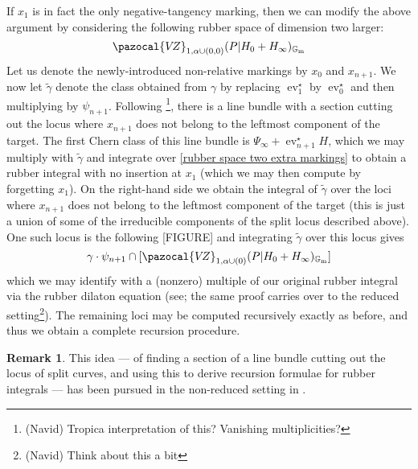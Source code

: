 \documentclass[11pt]{amsart}
\newcommand{\VZ}{\pazocal{V\!Z}}
\newcommand{\st}{\star}
\newcommand{\Gm}{\mathbb{G}_{\text{m}}}
\newcommand{\ev}{\operatorname{ev}}
\theoremstyle{definition}
\theoremstyle{definition}
\newtheorem{remark}[thm]{Remark}
\begin{document}
If $x_1$ is in fact the only negative-tangency marking, then we can modify the above argument by considering the following rubber space of dimension two larger:
\begin{equation}\label{rubber space two extra markings} \VZ_{1,\alpha\cup(0,0)}(P|H_0+H_\infty)_{\Gm} \end{equation}
Let us denote the newly-introduced non-relative markings by $x_0$ and $x_{n+1}$. We now let $\tilde\gamma$ denote the class obtained from $\gamma$ by replacing $\ev_1^\st$ by $\ev_0^\st$ and then multiplying by $\psi_{n+1}$. Following \cite{EKatz}\footnote{(Navid) Tropica interpretation of this? Vanishing multiplicities?}, there is a line bundle with a section cutting out the locus where $x_{n+1}$ does not belong to the leftmost component of the target. The first Chern class of this line bundle is $\Psi_\infty+\ev_{n+1}^\st H$, which we may multiply with $\tilde\gamma$ and integrate over \eqref{rubber space two extra markings} to obtain a rubber integral with no insertion at $x_1$ (which we may then compute by forgetting $x_1$). On the right-hand side we obtain the integral of $\tilde\gamma$ over the loci where $x_{n+1}$ does not belong to the leftmost component of the target (this is just a union of some of the irreducible components of the split locus described above). One such locus is the following
[FIGURE]
and integrating $\tilde\gamma$ over this locus gives
\begin{equation*} \gamma\cdot\psi_{n+1}\cap [\VZ_{1,\alpha\cup(0)}(P|H_0+H_\infty)_{\Gm}] \end{equation*}
which we may identify with a (nonzero) multiple of our original rubber integral via the rubber dilaton equation (see\cite{MaulikPandharipande}; the same proof carries over to the reduced setting\footnote{(Navid) Think about this a bit}). The remaining loci may be computed recursively exactly as before, and thus we obtain a complete recursion procedure.

\begin{remark} This idea --- of finding a section of a line bundle cutting out the locus of split curves, and using this to derive recursion formulae for rubber integrals --- has been pursued in the non-reduced setting in \cite{EKatz}.\end{remark}

\newpage
\end{document}
